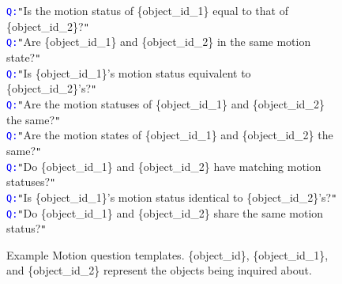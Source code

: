 \begin{figure*}[htbp]
\begin{tcolorbox}[colback=gray!10,%
	colframe=black,%
	width=\textwidth,
	arc=1mm, auto outer arc,
	boxrule=0.5pt,
	]
	\texttt{\textcolor{blue}{Q:}}\texttt{"}Is the motion status of \mbox{\{object\_id\_1\}} equal to that of \mbox{\{object\_id\_2\}}?\texttt{"}\\
        \texttt{\textcolor{blue}{Q:}}\texttt{"}Are \mbox{\{object\_id\_1\}} and \mbox{\{object\_id\_2\}} in the same motion state?\texttt{"}\\
        \texttt{\textcolor{blue}{Q:}}\texttt{"}Is \mbox{\{object\_id\_1\}}'s motion status equivalent to \mbox{\{object\_id\_2\}}'s?\texttt{"}\\
        \texttt{\textcolor{blue}{Q:}}\texttt{"}Are the motion statuses of \mbox{\{object\_id\_1\}} and \mbox{\{object\_id\_2\}} the same?\texttt{"}\\
        \texttt{\textcolor{blue}{Q:}}\texttt{"}Are the motion states of \mbox{\{object\_id\_1\}} and \mbox{\{object\_id\_2\}} the same?\texttt{"}\\
        \texttt{\textcolor{blue}{Q:}}\texttt{"}Do \mbox{\{object\_id\_1\}} and \mbox{\{object\_id\_2\}} have matching motion statuses?\texttt{"}\\
        \texttt{\textcolor{blue}{Q:}}\texttt{"}Is \mbox{\{object\_id\_1\}}'s motion status identical to \mbox{\{object\_id\_2\}}'s?\texttt{"}\\
        \texttt{\textcolor{blue}{Q:}}\texttt{"}Do \mbox{\{object\_id\_1\}} and \mbox{\{object\_id\_2\}} share the same motion status?\texttt{"}\\


\end{tcolorbox}
\caption{Example Motion question templates. \mbox{\{object\_id\}}, \mbox{\{object\_id\_1\}}, and \mbox{\{object\_id\_2\}} represent the objects being inquired about.}
\label{fig:motion_qa_templates}
\end{figure*}



